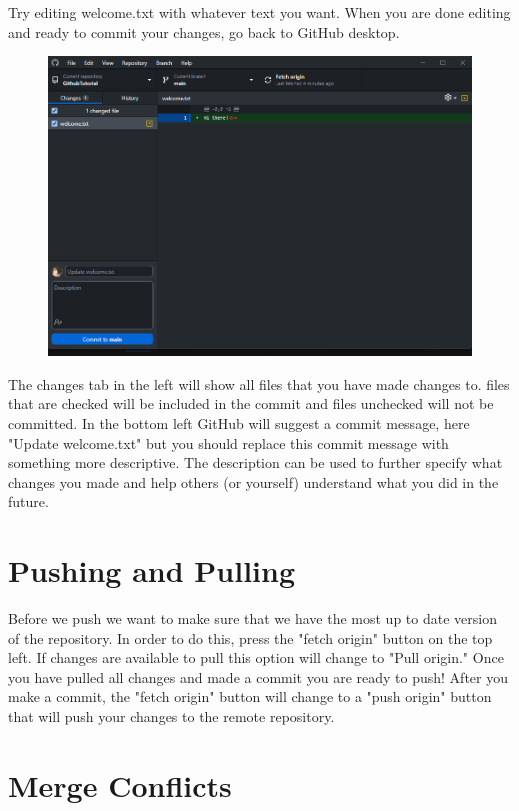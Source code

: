 \documentclass[10pt,twocolumn]{article}
\begin{document}
    Try editing welcome.txt with whatever text you want. When you are done editing and ready to commit your changes, go back to GitHub desktop.
    \begin{figure}
        \centering
        \includegraphics[width=1\linewidth]{commit.png}
    \end{figure}
    The changes tab in the left will show all files that you have made changes to. files that are checked will be included in the commit and files unchecked will not be committed. In the bottom left GitHub will suggest a commit message, here "Update welcome.txt" but you should replace this commit message with something more descriptive. The description can be used to further specify what changes you made and help others (or yourself) understand what you did in the future.

\section{Pushing and Pulling}

    Before we push we want to make sure that we have the most up to date version of the repository. In order to do this, press the "fetch origin" button on the top left. If changes are available to pull this option will change to "Pull origin." Once you have pulled all changes and made a commit you are ready to push! After you make a commit, the "fetch origin" button will change to a "push origin" button that will push your changes to the remote repository.

\section{Merge Conflicts}
\end{document}

